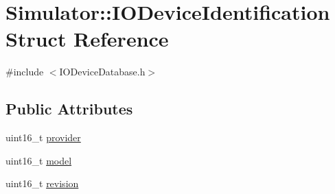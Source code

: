 \hypertarget{struct_simulator_1_1_i_o_device_identification}{\section{Simulator\+:\+:I\+O\+Device\+Identification Struct Reference}
\label{struct_simulator_1_1_i_o_device_identification}
}


{\ttfamily \#include $<$I\+O\+Device\+Database.\+h$>$}

\subsection*{Public Attributes}
\begin{DoxyCompactItemize}
\item 
uint16\+\_\+t \hyperlink{struct_simulator_1_1_i_o_device_identification_aa40ec1760434450d3c1dc9a665d36abf}{provider}
\item 
uint16\+\_\+t \hyperlink{struct_simulator_1_1_i_o_device_identification_a3717c2349d4a0efe7698b5a87e5acd3f}{model}
\item 
uint16\+\_\+t \hyperlink{struct_simulator_1_1_i_o_device_identification_aaf9f036ceb58b4f67f56c183863bc72a}{revision}
\end{DoxyCompactItemize}


